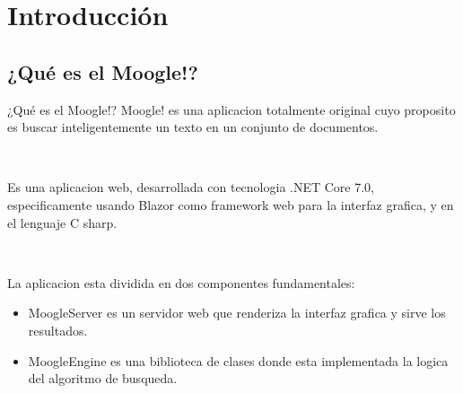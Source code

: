\section{Introducción}

\subsection{¿Qué es el Moogle!?}
\begin{frame}{¿Qué es el Moogle!?}
    Moogle! es una aplicacion totalmente original cuyo proposito es
buscar inteligentemente un texto en un conjunto de documentos.

\

Es una aplicacion web, desarrollada con tecnologia .NET Core
7.0, especificamente usando Blazor como framework web para la
interfaz grafica, y en el lenguaje C sharp.

\

La aplicacion esta dividida en dos componentes fundamentales:
\begin{itemize}
    \item MoogleServer es un servidor web que renderiza la interfaz
    grafica y sirve los resultados.

\pause 
    
    \item MoogleEngine es una biblioteca de clases donde esta
    implementada la logica del algoritmo de busqueda.
\end{itemize}    
\end{frame} 
